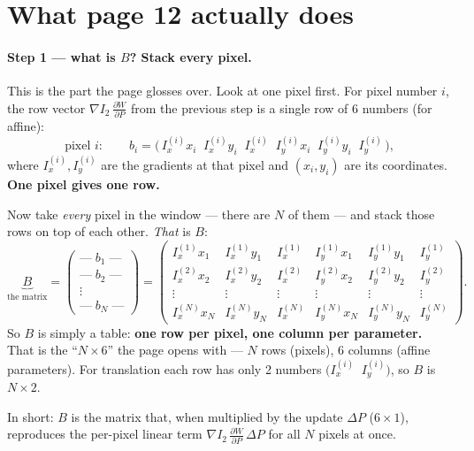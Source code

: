 \documentclass[11pt]{article}
\newcommand{\dP}{\Delta P}
\begin{document}
\section*{What page 12 actually does}

\paragraph{Step 1 --- what is $B$? Stack every pixel.}
This is the part the page glosses over. Look at one pixel first. For pixel
number $i$, the row vector $\nabla I_2\,\frac{\partial W}{\partial P}$ from the
previous step is a single row of 6 numbers (for affine):
\[
  \text{pixel } i:\qquad
  b_i = \big(\, I_x^{(i)} x_i \;\; I_x^{(i)} y_i \;\; I_x^{(i)} \;\;
               I_y^{(i)} x_i \;\; I_y^{(i)} y_i \;\; I_y^{(i)} \,\big),
\]
where $I_x^{(i)}, I_y^{(i)}$ are the gradients at that pixel and $(x_i,y_i)$ are
its coordinates. \textbf{One pixel gives one row.}

Now take \emph{every} pixel in the window --- there are $N$ of them --- and stack
those rows on top of each other. \emph{That} is $B$:
\[
  \underbrace{B}_{\text{the matrix}}
  =
  \begin{pmatrix}
    \text{---}\; b_1 \;\text{---} \\
    \text{---}\; b_2 \;\text{---} \\
    \vdots \\
    \text{---}\; b_N \;\text{---}
  \end{pmatrix}
  =
  \begin{pmatrix}
    I_x^{(1)} x_1 & I_x^{(1)} y_1 & I_x^{(1)} & I_y^{(1)} x_1 & I_y^{(1)} y_1 & I_y^{(1)} \\
    I_x^{(2)} x_2 & I_x^{(2)} y_2 & I_x^{(2)} & I_y^{(2)} x_2 & I_y^{(2)} y_2 & I_y^{(2)} \\
    \vdots & \vdots & \vdots & \vdots & \vdots & \vdots \\
    I_x^{(N)} x_N & I_x^{(N)} y_N & I_x^{(N)} & I_y^{(N)} x_N & I_y^{(N)} y_N & I_y^{(N)}
  \end{pmatrix}.
\]
So $B$ is simply a table: \textbf{one row per pixel, one column per parameter.}
That is the ``$N\times 6$'' the page opens with --- $N$ rows (pixels), 6 columns
(affine parameters). For translation each row has only 2 numbers
$\big(I_x^{(i)}\;\; I_y^{(i)}\big)$, so $B$ is $N\times 2$.

In short: $B$ is the matrix that, when multiplied by the update $\dP$
($6\times 1$), reproduces the per-pixel linear term
$\nabla I_2\,\frac{\partial W}{\partial P}\,\dP$ for all $N$ pixels at once.
\end{document}
